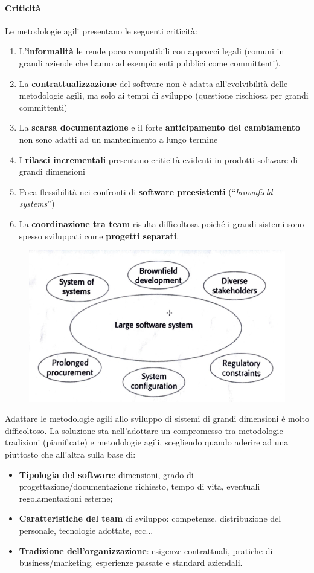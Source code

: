 \paragraph{Criticità} Le metodologie agili presentano le seguenti criticità:
\begin{enumerate}
    \item L'\textbf{informalità} le rende poco compatibili con approcci legali (comuni in grandi aziende che hanno ad esempio enti pubblici come committenti).
    \item La \textbf{contrattualizzazione} del software non è adatta all'evolvibilità delle metodologie agili, ma solo ai tempi di sviluppo (questione rischiosa per grandi committenti)
    \item La \textbf{scarsa documentazione} e il forte \textbf{anticipamento del cambiamento} non sono adatti ad un mantenimento a lungo termine
    \item I \textbf{rilasci incrementali} presentano criticità evidenti in prodotti software di grandi dimensioni
    \item Poca flessibilità nei confronti di \textbf{software preesistenti} (“\textit{brownfield systems}”)
    \item La \textbf{coordinazione tra team} risulta difficoltosa poiché i grandi sistemi sono spesso sviluppati come \textbf{progetti separati}.
\end{enumerate}

\begin{figure}[H]
    \centering
    \includegraphics[width=0.75\linewidth]{assets/large-software.png}
    \label{fig:large-software}
\end{figure}

\newpage
Adattare le metodologie agili allo sviluppo di sistemi di grandi dimensioni è molto difficoltoso. La soluzione sta nell'adottare un compromesso tra metodologie tradizioni (pianificate) e metodologie agili, scegliendo quando aderire ad una piuttosto che all'altra sulla base di:
\begin{itemize}
    \item \textbf{Tipologia del software}: dimensioni, grado di progettazione/documentazione richiesto, tempo di vita, eventuali regolamentazioni esterne;
    \item \textbf{Caratteristiche del team} di sviluppo: competenze, distribuzione del personale, tecnologie adottate, ecc...
    \item \textbf{Tradizione dell'organizzazione}: esigenze contrattuali, pratiche di business/marketing, esperienze passate e standard aziendali.
\end{itemize}

